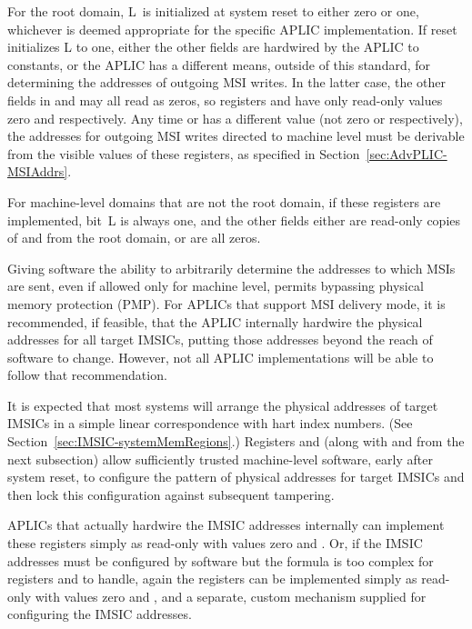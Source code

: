 For the root domain, L~is initialized at
system reset to either zero or one, whichever is
deemed appropriate for the specific APLIC implementation.
If reset initializes L to one, either the other fields are
hardwired by the APLIC to constants, or the APLIC has a different means,
outside of this standard, for determining the addresses of outgoing MSI
writes.
In the latter case, the other fields in  and
 may all read as zeros, so registers  and
 have only read-only values zero and 
respectively.
Any time  or  has a different value
(not zero or  respectively), the addresses for
outgoing MSI writes directed to machine level must be derivable
from the visible values of these registers, as specified in
Section~\ref{sec:AdvPLIC-MSIAddrs}.

For machine-level domains that are not the root domain, if these
registers are implemented, bit~L is always one, and the other
fields either are read-only copies of  and
 from the root domain, or are all zeros.

\begin{commentary}
Giving software the ability to arbitrarily determine the addresses to
which MSIs are sent, even if allowed only for machine level, permits
bypassing physical memory protection (PMP).
For APLICs that support MSI delivery mode, it is recommended, if
feasible, that the APLIC internally hardwire the physical addresses for
all target IMSICs, putting those addresses beyond the reach of software
to change.
However, not all APLIC implementations will be able to follow that
recommendation.

It is expected that most systems will arrange the
physical addresses of target IMSICs in a simple
linear correspondence with hart index numbers.
(See Section~\ref{sec:IMSIC-systemMemRegions}.)
Registers  and  (along with
 and  from the next subsection) allow
sufficiently trusted machine-level software, early after system reset,
to configure the pattern of physical addresses for target IMSICs and
then lock this configuration against subsequent tampering.

APLICs that actually hardwire the IMSIC addresses internally
can implement these registers simply as read-only with values zero
and .
Or, if the IMSIC addresses must be configured by software but
the formula is too complex for registers  and
 to handle, again the registers can be implemented
simply as read-only with values zero and , and a
separate, custom mechanism supplied for configuring the IMSIC
addresses.
\end{commentary}

